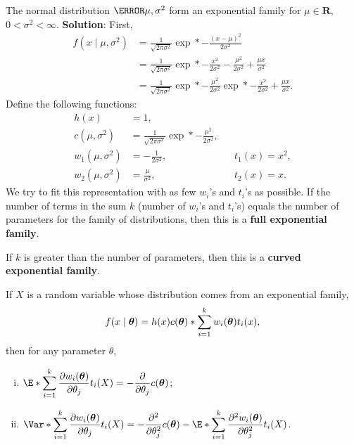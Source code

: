 \begin{Example}{}{}
    The normal distribution $ \N{\mu,\sigma^2} $ form an exponential family for $ \mu\in\mathbf{R} $, $ 0<\sigma^2<\infty $.
    \tcblower{}
    \textbf{Solution}: First,
    \begin{align*}
        f(x\mid \mu,\sigma^2)
         & =\frac{1}{\sqrt{2\pi\sigma^2}}\exp*{-\frac{(x-\mu)^2}{2\sigma^2}}                                                  \\
         & =\frac{1}{\sqrt{2\pi\sigma^2}}\exp*{-\frac{x^2}{2\sigma^2}-\frac{\mu^2}{2\sigma^2}+\frac{\mu x}{\sigma^2}}         \\
         & =\frac{1}{\sqrt{2\pi\sigma^2}}\exp*{-\frac{\mu^2}{2\sigma^2}}\exp*{-\frac{x^2}{2\sigma^2}+\frac{\mu x}{\sigma^2}}.
    \end{align*}
    Define the following functions:
    \begin{align*}
        h(x)              & =1,                                                                             \\
        c(\mu,\sigma^2)   & =\frac{1}{\sqrt{2\pi\sigma^2}}\exp*{-\frac{\mu^2}{2\sigma^2}},                  \\
        w_1(\mu,\sigma^2) & =-\frac{1}{2\sigma^2},                                         &  & t_1(x)=x^2, \\
        w_2(\mu,\sigma^2) & =\frac{\mu}{\sigma^2},                                         &  & t_2(x)=x.
    \end{align*}
    We try to fit this representation with as few $ w_i $'s and $ t_i $'s as possible. If the number of terms in the sum $ k $
    (number of $ w_i $'s and $ t_i $'s) equals the number of parameters for the family of distributions, then this is a
    \textbf{full exponential family}.

    If $ k $ is greater than the number of parameters, then this is a \textbf{curved exponential family}.
\end{Example}
\begin{Theorem}{}{}
    If $ X $ is a random variable whose distribution comes from an exponential family,
    \[ f(x\mid \bm{\theta})=h(x)c(\bm{\theta})\relax*{\sum_{i=1}^{k}w_i(\bm{\theta})t_i(x)}, \]
    then for any parameter $ \theta $,
    \begin{enumerate}[(i)]
        \item $ \displaystyle \E*{\sum_{i=1}^{k}\pdv{w_i(\Vector{\theta})}{\theta_j}t_i(X)}=-\pdv*{\ln{c(\Vector{\theta})}}{\theta_j} $;
        \item $ \displaystyle \Var*{\sum_{i=1}^{k}\pdv{w_i(\Vector{\theta})}{\theta_j}t_i(X)}=-\pdv*[order=2]{\ln{c(\Vector{\theta})}}{\theta_j}-\E*{\sum_{i=1}^{k}\pdv[order=2]{w_i(\Vector{\theta})}{\theta_j}t_i(X)} $.
    \end{enumerate}
\end{Theorem}
